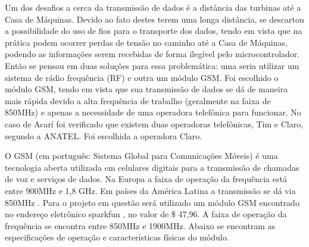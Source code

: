 Um dos desafios a cerca da transmissão de dados é a distância das turbinas até a Casa de Máquinas. Devido ao fato destes terem uma longa distância, se descartou a possibilidade do uso de fios para o transporte dos dados, tendo em vista que na prática podem ocorrer perdas de tensão no caminho até a Casa de Máquinas, podendo as informações serem recebidas de forma ilegível pelo microcontrolador. Então se pensou em duas soluções para essa problemática: uma seria utilizar um sistema de rádio frequência (RF) e outra um módulo GSM. Foi escolhido o módulo GSM, tendo em vista que sua transmissão de dados se dá de maneira mais rápida devido a alta frequência de trabalho (geralmente na faixa de 850MHz) e apenas a necessidade de uma operadora telefônica para funcionar. No caso de Acarí foi verificado que existem duas operadoras telefônicas, Tim e Claro, segundo a ANATEL. Foi escolhida a operadora Claro.

O GSM (em português: Sistema Global para Comunicações Móveis) é uma tecnologia aberta utilizada em celulares digitais para a transmissão de chamadas de voz e serviços de dados. Na Europa a faixa de operação da frequência está entre 900MHz e 1,8 GHz. Em países da América Latina a transmissão se dá via 850MHz \footnotemark.
Para o projeto em questão será utilizado um módulo GSM encontrado no endereço eletrônico sparkfun \footnotemark , no valor de \$ 47,96. A faixa de operação da frequência se encontra entre 850MHz e 1900MHz. Abaixo se encontram as especificações de operação e características físicas do módulo.


